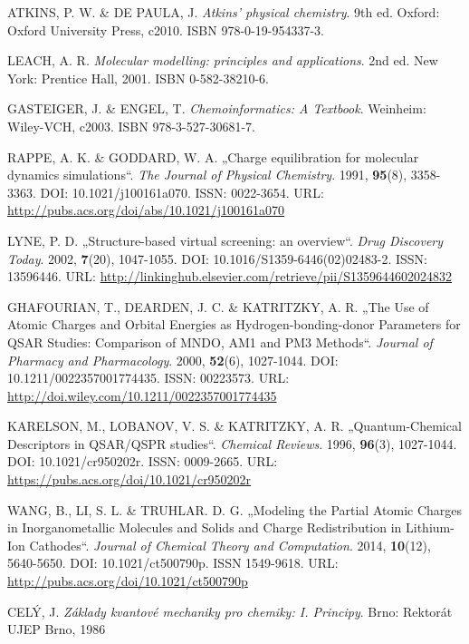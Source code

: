 \begin{thebibliography}{10}

ATKINS, P. W. \& DE PAULA, J. \textit{Atkins' physical chemistry}. 9th ed. Oxford: Oxford University Press, c2010. ISBN 978-0-19-954337-3.

LEACH, A. R. \textit{Molecular modelling: principles and applications}. 2nd ed. New York: Prentice Hall, 2001. ISBN 0-582-38210-6.

GASTEIGER, J. \& ENGEL, T. \textit{Chemoinformatics: A Textbook}. Weinheim: Wiley-VCH, c2003. ISBN 978-3-527-30681-7.

RAPPE, A. K. \& GODDARD, W. A. „Charge equilibration for molecular dynamics simulations“. \textit{The Journal of Physical Chemistry}. 1991, \textbf{95}(8), 3358-3363. DOI: 10.1021/j100161a070. ISSN: 0022-3654. URL: \url{http://pubs.acs.org/doi/abs/10.1021/j100161a070}

LYNE, P. D. „Structure-based virtual screening: an overview“. \textit{Drug Discovery Today}. 2002, \textbf{7}(20), 1047-1055. DOI: 10.1016/S1359-6446(02)02483-2. ISSN: 13596446. URL: \url{http://linkinghub.elsevier.com/retrieve/pii/S1359644602024832}

GHAFOURIAN, T., DEARDEN, J. C. \& KATRITZKY, A. R. „The Use of Atomic Charges and Orbital Energies as Hydrogen-bonding-donor Parameters for QSAR Studies: Comparison of MNDO, AM1 and PM3 Methods“. \textit{Journal of Pharmacy and Pharmacology}. 2000, \textbf{52}(6), 1027-1044. DOI: 10.1211/0022357001774435. ISSN: 00223573. URL:  \url{http://doi.wiley.com/10.1211/0022357001774435}

KARELSON, M., LOBANOV, V. S. \& KATRITZKY, A. R. „Quantum-Chemical Descriptors in QSAR/QSPR studies“. \textit{Chemical Reviews}. 1996, \textbf{96}(3), 1027-1044. DOI: 10.1021/cr950202r. ISSN: 0009-2665. URL: \url{https://pubs.acs.org/doi/10.1021/cr950202r}

WANG, B., LI, S. L. \& TRUHLAR. D. G. „Modeling the Partial Atomic Charges in Inorganometallic Molecules and Solids and Charge Redistribution in Lithium-Ion Cathodes“. \textit{Journal of Chemical Theory and Computation}. 2014, \textbf{10}(12), 5640-5650. DOI: 10.1021/ct500790p. ISSN 1549-9618. URL: \url{http://pubs.acs.org/doi/10.1021/ct500790p}

CELÝ, J. \textit{Základy kvantové mechaniky pro chemiky: I. Principy}. Brno: Rektorát UJEP Brno, 1986


\end{thebibliography}
